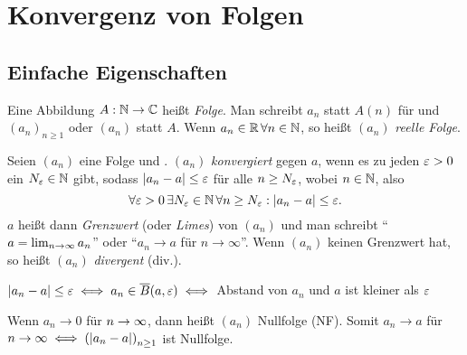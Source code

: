 \documentclass[12pt]{scrreprt}
\begin{document}
\chapter{Konvergenz von Folgen}
\label{cha:konv}

\section{Einfache Eigenschaften}
\label{sec:konv.eigenschaften}
\begin{dfn}
\label{dev:konv.folge}
Eine Abbildung $A: \mathbb{N} \rightarrow \mathbb{C}$ heißt \emph{Folge}. Man schreibt $a_n$ statt $A(n)$ für  und $(a_n)_{n\ge1}$ oder $(a_n)$ statt $A$. Wenn $a_n\in\mathbb{R}\,\forall n\in\mathbb{N}$, so heißt $(a_n)$ \emph{reelle Folge}.
\end{dfn}

\begin{dfn}
\label{dfn:konv.konv}
Seien $(a_n)$ eine Folge und . $(a_n)$ \emph{konvergiert} gegen $a$, wenn es zu jeden $\varepsilon>0$ ein $N_\varepsilon\in\mathbb{N}$ gibt, sodass $\left\lvert a_n-a\right\lvert\le\varepsilon$ für alle $n\ge N_\varepsilon$, wobei $n\in\mathbb{N}$, also 
\[\forall\varepsilon>0\,\exists N_\varepsilon\in\mathbb{N}\,\forall n\ge N_\varepsilon:\left\lvert a_n-a\right\lvert\le\varepsilon.\]
$a$ heißt dann \emph{Grenzwert} (oder \emph{Limes}) von $(a_n)$ und man schreibt "`$a = \lim_{n\rightarrow\infty}a_n$"' oder "`$a_n \to a$ für $n \to \infty$"'. Wenn $(a_n)$ keinen Grenzwert hat, so heißt $(a_n)$ \emph{divergent} (div.).
\end{dfn}

\begin{bem*}
$\left\lvert a_n-a\right\lvert\le\varepsilon \iff a_n \in \overline{B}(a,\varepsilon) \iff $ Abstand von $a_n$ und $a$ ist kleiner als $\varepsilon$
\end{bem*}

\begin{bem*}
Wenn $a_n \to 0$ für $n\rightarrow\infty$, dann heißt $(a_n)$ Nullfolge (NF). Somit $a_n \to a$ für $n\rightarrow\infty \iff \left(\left\lvert a_n-a\right\lvert\right)_{n\ge1}$ ist Nullfolge.
\end{bem*}
\end{document}
